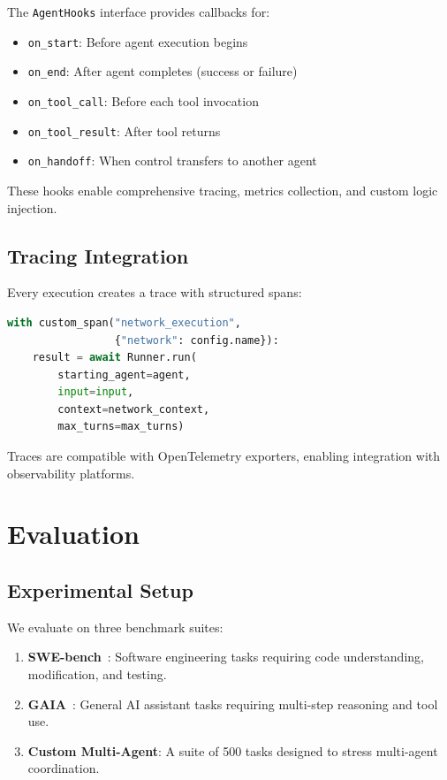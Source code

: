 \documentclass[11pt,twocolumn]{article}
\begin{document}
The \texttt{AgentHooks} interface provides callbacks for:
\begin{itemize}
    \item \texttt{on\_start}: Before agent execution begins
    \item \texttt{on\_end}: After agent completes (success or failure)
    \item \texttt{on\_tool\_call}: Before each tool invocation
    \item \texttt{on\_tool\_result}: After tool returns
    \item \texttt{on\_handoff}: When control transfers to another agent
\end{itemize}

These hooks enable comprehensive tracing, metrics collection, and custom logic injection.

\subsection{Tracing Integration}

Every execution creates a trace with structured spans:

\begin{lstlisting}[language=Python]
with custom_span("network_execution",
                 {"network": config.name}):
    result = await Runner.run(
        starting_agent=agent,
        input=input,
        context=network_context,
        max_turns=max_turns)
\end{lstlisting}

Traces are compatible with OpenTelemetry exporters, enabling integration with observability platforms.

\section{Evaluation}

\subsection{Experimental Setup}

We evaluate on three benchmark suites:
\begin{enumerate}
    \item \textbf{SWE-bench}~\cite{swebench2023}: Software engineering tasks requiring code understanding, modification, and testing.
    \item \textbf{GAIA}~\cite{gaia2023}: General AI assistant tasks requiring multi-step reasoning and tool use.
    \item \textbf{Custom Multi-Agent}: A suite of 500 tasks designed to stress multi-agent coordination.
\end{enumerate}
\end{document}
